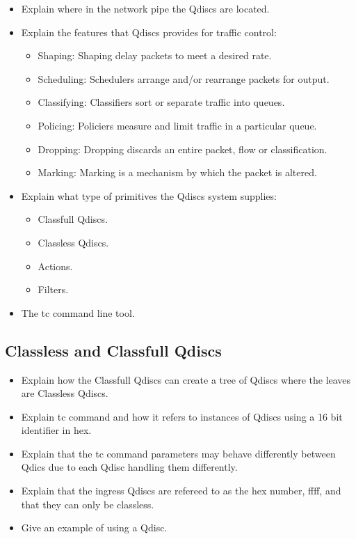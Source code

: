 \documentclass[sigconf, nonacm]{acmart}
\begin{document}
\begin{itemize}
  \item Explain where in the network pipe the Qdiscs are located.
  \item Explain the features that Qdiscs provides for traffic control:
        \begin{itemize}
          \item Shaping: Shaping delay packets to meet a desired rate.
          \item Scheduling: Schedulers arrange and/or rearrange packets for output.
          \item Classifying: Classifiers sort or separate traffic into queues.
          \item Policing: Policiers measure and limit traffic in a particular queue.
          \item Dropping: Dropping discards an entire packet, flow or classification.
          \item Marking: Marking is a mechanism by which the packet is altered.
        \end{itemize}
  \item Explain what type of primitives the Qdiscs system supplies:
        \begin{itemize}
          \item Classfull Qdiscs.
          \item Classless Qdiscs.
          \item Actions.
          \item Filters.
        \end{itemize}
  \item The tc command line tool.
\end{itemize}



\subsection{Classless and Classfull Qdiscs}

\begin{itemize}
  \item Explain how the Classfull Qdiscs can create a tree of Qdiscs where the leaves are Classless Qdiscs.
  \item Explain tc command and how it refers to instances of Qdiscs using a 16 bit identifier in hex.
        \item Explain that the tc command parameters may behave differently between Qdics due to each Qdisc handling them differently.
  \item Explain that the ingress Qdiscs are refereed to as the hex number, ffff, and that they can only be classless.
  \item Give an example of using a Qdisc.
\end{itemize}
\end{document}
